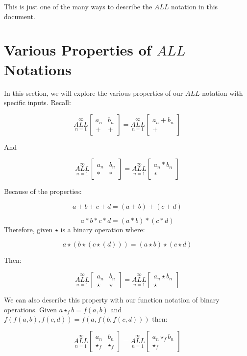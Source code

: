 \documentclass{article}
\begin{document}
This is just one of the many ways to describe the $ALL$ notation in this document.

\section{Various Properties of $ALL$ Notations}

In this section, we will explore the various properties of our $ALL$ notation with specific inputs.
Recall:

$$\underset{n=1}{\overset{\infty}{ALL}} \begin{bmatrix}
a_n & b_n \\
+& +
\end{bmatrix} = \underset{n=1}{\overset{\infty}{ALL}} \begin{bmatrix}
a_n + b_n \\
 +
\end{bmatrix}$$

And

$$\underset{n=1}{\overset{\infty}{ALL}} \begin{bmatrix}
a_n & b_n \\
*& *
\end{bmatrix} = \underset{n=1}{\overset{\infty}{ALL}} \begin{bmatrix}
a_n * b_n \\
 *
\end{bmatrix}$$

Because of the properties:

$$a+b+c+d=(a+b)+(c+d)$$

$$a*b*c*d=(a*b)*(c*d)$$
Therefore, given $\star$ is a binary operation where:

$$a\star(b\star(c\star(d)))=(a \star b) \star (c \star d)$$ 

Then:

$$\underset{n=1}{\overset{\infty}{ALL}} \begin{bmatrix}
a_n & b_n \\
\star & \star
\end{bmatrix} = \underset{n=1}{\overset{\infty}{ALL}} \begin{bmatrix}
a_n \star b_n \\
 \star
\end{bmatrix}$$

We can also describe this property with our function notation of binary operations. Given $a\star_fb=f(a,b)$ and $f(f(a,b),f(c,d))=f(a,f(b,f(c,d)))$ then:

$$\underset{n=1}{\overset{\infty}{ALL}} \begin{bmatrix}
a_n & b_n \\
\star_f & \star_f
\end{bmatrix} = \underset{n=1}{\overset{\infty}{ALL}} \begin{bmatrix}
a_n \star_f b_n \\
 \star_f
\end{bmatrix}$$
\end{document}
